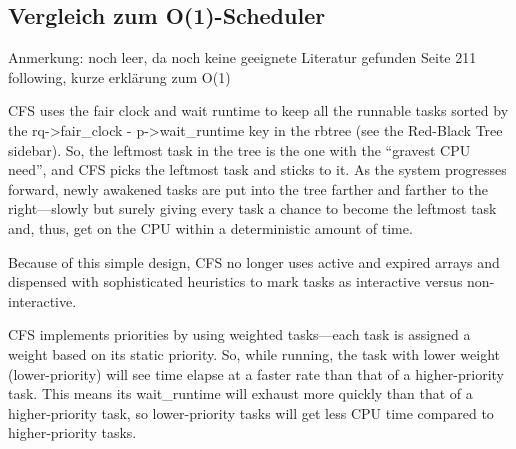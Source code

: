\subsection{Vergleich zum O(1)-Scheduler}\label{s:compO1}
Anmerkung: noch leer, da noch keine geeignete Literatur gefunden
 \cite{asilberschatz}  Seite 211 following, kurze erklärung zum O(1)
 
  CFS uses the fair clock and wait runtime to keep all the runnable tasks sorted by the rq->fair\_clock - p->wait\_runtime key in the rbtree (see the Red-Black Tree sidebar). So, the leftmost task in the tree is the one with the “gravest CPU need”, and CFS picks the leftmost task and sticks to it. As the system progresses forward, newly awakened tasks are put into the tree farther and farther to the right—slowly but surely giving every task a chance to become the leftmost task and, thus, get on the CPU within a deterministic amount of time.
 
 Because of this simple design, CFS no longer uses active and expired arrays and dispensed with sophisticated heuristics to mark tasks as interactive versus non-interactive.
 
 CFS implements priorities by using weighted tasks—each task is assigned a weight based on its static priority. So, while running, the task with lower weight (lower-priority) will see time elapse at a faster rate than that of a higher-priority task. This means its wait\_runtime will exhaust more quickly than that of a higher-priority task, so lower-priority tasks will get less CPU time compared to higher-priority tasks. 
 \cite{cpab la}
